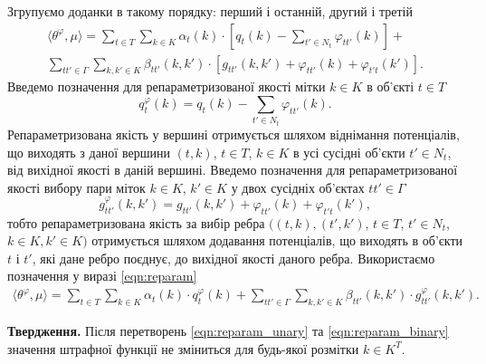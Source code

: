Згрупуємо доданки в такому порядку: перший і останній, другий і третій
\begin{equation}
  \label{eqn:reparam}
  \begin{gathered}
  \langle\theta^{\varphi},\mu\rangle = \sum\limits_{t\in T}\sum\limits_{k\in K} \alpha_t(k)\cdot \left[ q_t(k)- \sum\limits_{t'\in N_t} \varphi_{tt'}(k) \right]+\\
  \sum\limits_{tt'\in \Gamma}\sum\limits_{k,k'\in K} \beta_{tt'}(k,k')\cdot \left[g_{tt'}(k,k') + \varphi_{tt'}(k) + \varphi_{t't}(k') \right].
  \end{gathered}
\end{equation}
Введемо позначення для репараметризованої якості мітки $k\in K$ в
об'єкті $t\in T$
\begin{equation}
  \label{eqn:reparam_unary}
  q^{\varphi}_t(k) = q_t(k) - \sum\limits_{t'\in N_t} \varphi_{tt'}(k).
\end{equation}
Репараметризована якість у вершині отримується шляхом віднімання потенціалів,
що виходять з даної вершини $(t,k)$, $t\in T$, $k\in K$ в усі сусідні об'єкти
$t'\in N_t$, від вихідної якості в даній вершині. Введемо позначення для
репараметризованої якості вибору пари міток $k\in K$, $k'\in K$ у двох сусідніх
об'єктах $tt'\in\Gamma$
\begin{equation}
  \label{eqn:reparam_binary}
  g^{\varphi}_{tt'}(k,k') = g_{tt'}(k,k') + \varphi_{tt'}(k) + \varphi_{t't}(k'),
\end{equation}
тобто репараметризована якість за вибір ребра $((t,k),(t',k')$, $t\in T$, $t'\in N_t$, $k\in K, k'\in K)$
отримується шляхом додавання потенціалів, що виходять в об'єкти $t$ і $t'$, які дане ребро поєднує,
до вихідної якості даного ребра.
Використаємо позначення у виразі \eqref{eqn:reparam}
\begin{gather*}
  \langle\theta^{\varphi},\mu\rangle =  \sum\limits_{t\in T}\sum\limits_{k\in K} \alpha_t(k)\cdot q^{\varphi}_t(k)+
  \sum\limits_{tt'\in \Gamma}\sum\limits_{k,k'\in K} \beta_{tt'}(k,k')\cdot g^{\varphi}_{tt'}(k,k').
\end{gather*}

\textbf{Твердження.}
Після перетворень \eqref{eqn:reparam_unary} та \eqref{eqn:reparam_binary} значення
штрафної функції не зміниться для будь-якої розмітки $k\in K^T$.

